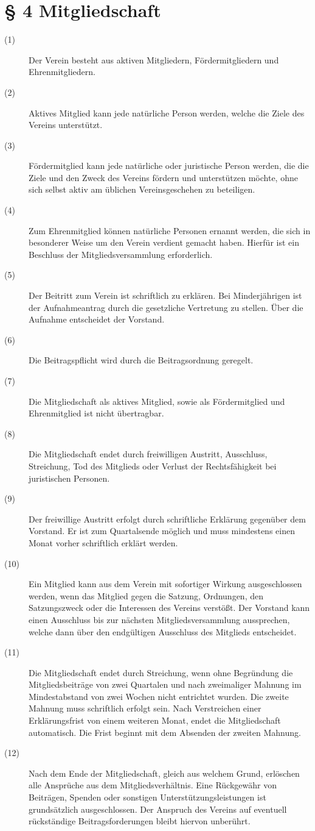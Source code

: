 \documentclass[a4paper,12pt]{scrartcl}
\begin{document}
\section*{\S{} 4 Mitgliedschaft}
\begin{description} 

\item[(1)] Der Verein besteht aus aktiven Mitgliedern, Fördermitgliedern und Ehrenmitgliedern.
\item[(2)] Aktives Mitglied kann jede natürliche Person werden, welche die Ziele des Vereins unterstützt.
\item[(3)] Fördermitglied kann jede natürliche oder juristische Person werden, die die Ziele und den Zweck des Vereins fördern und unterstützen möchte, ohne sich selbst aktiv am üblichen Vereinsgeschehen zu beteiligen.
\item[(4)] Zum Ehrenmitglied können natürliche Personen ernannt werden, die sich in besonderer Weise um den Verein verdient gemacht haben. Hierfür ist ein Beschluss der Mitgliedsversammlung erforderlich.
\item[(5)] Der Beitritt zum Verein ist schriftlich zu erklären. Bei Minderjährigen ist der Aufnahmeantrag durch die gesetzliche Vertretung zu stellen. Über die Aufnahme entscheidet der Vorstand.
\item[(6)] Die Beitragspflicht wird durch die Beitragsordnung geregelt.
\item[(7)] Die Mitgliedschaft als aktives Mitglied, sowie als Fördermitglied und Ehrenmitglied ist nicht übertragbar. 
\item[(8)] Die Mitgliedschaft endet durch freiwilligen Austritt, Ausschluss, Streichung, Tod des Mitglieds oder Verlust der Rechtsfähigkeit bei juristischen Personen. 
\item[(9)] Der freiwillige Austritt erfolgt durch schriftliche Erklärung gegenüber dem Vorstand. Er ist zum Quartalsende möglich und muss mindestens einen Monat vorher schriftlich erklärt werden. 
\item[(10)] Ein Mitglied kann aus dem Verein mit sofortiger Wirkung ausgeschlossen werden, wenn das Mitglied gegen die Satzung, Ordnungen, den Satzungszweck oder die Interessen des Vereins verstößt. Der Vorstand kann einen Ausschluss bis zur nächsten Mitgliedsversammlung aussprechen, welche dann über den endgültigen Ausschluss des Mitglieds entscheidet. 
\item[(11)] Die Mitgliedschaft endet durch Streichung, wenn ohne Begründung die Mitgliedsbeiträge von zwei Quartalen und nach zweimaliger Mahnung im Mindestabstand von zwei Wochen nicht entrichtet wurden. Die zweite Mahnung muss schriftlich erfolgt sein. Nach Verstreichen einer Erklärungsfrist von einem weiteren Monat, endet die Mitgliedschaft automatisch. Die Frist beginnt mit dem Absenden der zweiten Mahnung. 
\item[(12)] Nach dem Ende der Mitgliedschaft, gleich aus welchem Grund, erlöschen alle Ansprüche aus dem Mitgliedsverhältnis. Eine Rückgewähr von Beiträgen, Spenden oder sonstigen Unterstützungsleistungen ist grundsätzlich ausgeschlossen. Der Anspruch des Vereins auf eventuell rückständige Beitragsforderungen bleibt hiervon unberührt.


\end{description}
\end{document}
